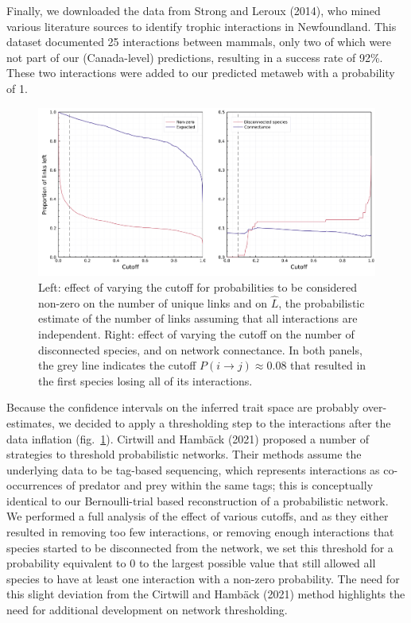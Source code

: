 \documentclass[10pt,oneside]{article}
\makeatletter
\def\maxwidth{\ifdim\Gin@nat@width>\linewidth\linewidth
\else\Gin@nat@width\fi}
\let\Oldincludegraphics\includegraphics
\renewcommand{\includegraphics}[1]{\Oldincludegraphics[width=\maxwidth]{#1}}
\makeatother
\begin{document}
Finally, we downloaded the data from Strong and Leroux (2014), who mined
various literature sources to identify trophic interactions in
Newfoundland. This dataset documented 25 interactions between mammals,
only two of which were not part of our (Canada-level) predictions,
resulting in a success rate of 92\%. These two interactions were added
to our predicted metaweb with a probability of 1.

\begin{figure}
\hypertarget{fig:thresholds}{%
\centering
\includegraphics{figures/figure-cutoffs.png}
\caption{Left: effect of varying the cutoff for probabilities to be
considered non-zero on the number of unique links and on \(\hat{L}\),
the probabilistic estimate of the number of links assuming that all
interactions are independent. Right: effect of varying the cutoff on the
number of disconnected species, and on network connectance. In both
panels, the grey line indicates the cutoff
\(P(i\rightarrow j) \approx 0.08\) that resulted in the first species
losing all of its interactions.}\label{fig:thresholds}
}
\end{figure}

Because the confidence intervals on the inferred trait space are
probably over-estimates, we decided to apply a thresholding step to the
interactions after the data inflation (fig.~\ref{fig:thresholds}).
Cirtwill and Hambäck (2021) proposed a number of strategies to threshold
probabilistic networks. Their methods assume the underlying data to be
tag-based sequencing, which represents interactions as co-occurrences of
predator and prey within the same tags; this is conceptually identical
to our Bernoulli-trial based reconstruction of a probabilistic network.
We performed a full analysis of the effect of various cutoffs, and as
they either resulted in removing too few interactions, or removing
enough interactions that species started to be disconnected from the
network, we set this threshold for a probability equivalent to 0 to the
largest possible value that still allowed all species to have at least
one interaction with a non-zero probability. The need for this slight
deviation from the Cirtwill and Hambäck (2021) method highlights the
need for additional development on network thresholding.
\end{document}
